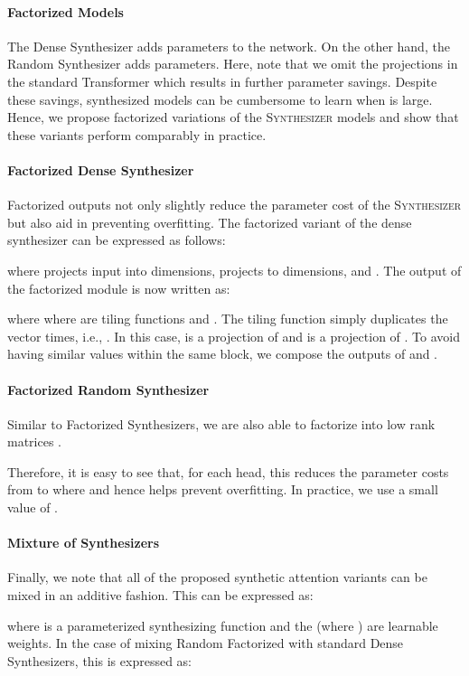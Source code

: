 \documentclass{article}
\begin{document}
\paragraph{Factorized Models} 
The Dense Synthesizer adds  parameters to the network. On the other hand, the Random Synthesizer adds  parameters. Here, note that we omit the  projections in the standard Transformer which results in further parameter savings. Despite these savings, synthesized models can be cumbersome to learn when  is large. Hence, we propose factorized variations of the \textsc{Synthesizer} models and show that these variants perform comparably in practice.
\paragraph{Factorized Dense Synthesizer}
Factorized outputs not only slightly reduce the parameter cost of the \textsc{Synthesizer} but also aid in preventing overfitting. The factorized variant of the dense synthesizer can be expressed as follows:

where  projects input  into  dimensions,  projects  to  dimensions, and . The output of the factorized module is now written as:

where  where  are tiling functions and . The tiling function simply duplicates the vector  times, i.e., . In this case,  is a projection of  and  is a projection of . To avoid having similar values within the same block, we compose the outputs of  and .


\paragraph{Factorized Random Synthesizer}
Similar to Factorized Synthesizers, we are also able to factorize  into low rank matrices .

Therefore, it is easy to see that, for each head, this reduces the parameter costs from  to  where  and hence helps prevent overfitting. In practice, we use a small value of . 



\paragraph{Mixture of Synthesizers} Finally, we note that all of the proposed synthetic attention variants can be mixed in an additive fashion. This can be expressed as:

where  is a parameterized synthesizing function and the  (where ) are learnable weights. In the case of mixing Random Factorized with standard Dense Synthesizers, this is expressed as:
\end{document}
